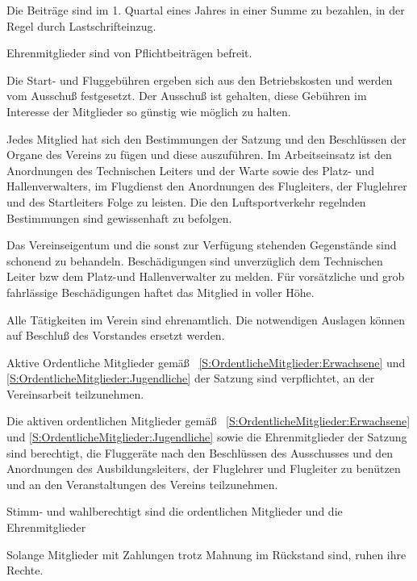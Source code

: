 \documentclass[10pt,a4paper,parskip=half]{scrartcl}
\begin{document}
\begin{contract}
    Die Beiträge sind im 1. Quartal eines Jahres in einer Summe zu bezahlen,
    in der Regel durch Lastschrifteinzug.
    
    Ehrenmitglieder sind von Pflichtbeiträgen befreit.
    
    Die Start- und Fluggebühren ergeben sich aus den Betriebskosten und werden vom Ausschuß festgesetzt.
    Der Ausschuß ist gehalten,
    diese Gebühren im Interesse der Mitglieder so günstig wie möglich zu halten.
    
    
    Jedes Mitglied hat sich den Bestimmungen der Satzung und den Beschlüssen der Organe des Vereins zu fügen und diese auszuführen.
    Im Arbeitseinsatz ist den Anordnungen des Technischen Leiters und der Warte sowie des Platz- und Hallenverwalters,
    im Flugdienst den Anordnungen des Flugleiters,
    der Fluglehrer und des Startleiters Folge zu leisten.
    Die den Luftsportverkehr regelnden Bestimmungen sind gewissenhaft zu befolgen.
    
    Das Vereinseigentum und die sonst zur Verfügung stehenden Gegenstände sind schonend zu behandeln.
    Beschädigungen sind unverzüglich dem Technischen Leiter bzw dem Platz-und Hallenverwalter zu melden.
    Für vorsätzliche und grob fahrlässige Beschädigungen haftet das Mitglied in voller Höhe.
    
    Alle Tätigkeiten im Verein sind ehrenamtlich.
    Die notwendigen Auslagen können auf Beschluß des Vorstandes ersetzt werden.
    
    Aktive Ordentliche Mitglieder gemäß ~\autoref{S:OrdentlicheMitglieder:Erwachsene} und \autoref{S:OrdentlicheMitglieder:Jugendliche} der Satzung sind verpflichtet,
    an der Vereinsarbeit teilzunehmen.
    
    
    Die aktiven ordentlichen Mitglieder gemäß ~\autoref{S:OrdentlicheMitglieder:Erwachsene} und \autoref{S:OrdentlicheMitglieder:Jugendliche}
    sowie die Ehrenmitglieder der Satzung sind berechtigt,
    die Fluggeräte nach den Beschlüssen des Ausschusses und den Anordnungen des Ausbildungsleiters,
    der Fluglehrer und Flugleiter zu benützen und an den Veranstaltungen des Vereins teilzunehmen.
    
    Stimm- und wahlberechtigt sind die ordentlichen Mitglieder und die Ehrenmitglieder
    
    Solange Mitglieder mit Zahlungen trotz Mahnung im Rückstand sind,
    ruhen ihre Rechte.
    

\end{contract}
\end{document}
